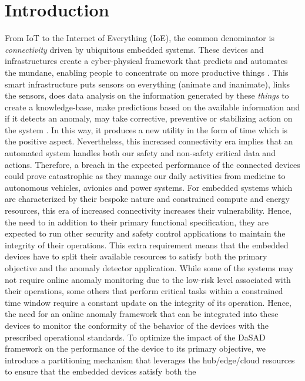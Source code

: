 \section{Introduction}
\label{sec:introduction}
From IoT to the Internet of Everything (IoE), the common denominator is 
\emph{connectivity} driven by ubiquitous embedded systems. These devices and 
infrastructures create a cyber-physical framework that predicts and automates 
the mundane, enabling people to concentrate on more productive things 
\cite{weldon2016future}. This smart infrastructure puts sensors on everything 
(animate and inanimate), links the sensors, does data analysis on the 
information generated by these \emph{things} to create a knowledge-base, make
predictions based on the available information and if it detects an anomaly, 
may take corrective, preventive or stabilizing action on the system 
\cite{ezeme2015multi}. In this way, it produces a new utility in the form of 
time which is the positive aspect. Nevertheless, this increased connectivity 
era implies that an automated system handles both our safety and non-safety 
critical data and actions. Therefore, a breach in the expected performance of 
the connected devices could prove catastrophic as they manage our daily 
activities from medicine to autonomous vehicles, avionics and power systems. 
For embedded systems which are characterized by their bespoke nature and 
constrained compute and energy resources, this era of increased connectivity 
increases their vulnerability. Hence, the need to in addition to their primary 
functional specification, they are expected to run other security and safety 
control applications
to maintain the integrity of their operations. This extra requirement means 
that the embedded devices have to split their available resources to satisfy 
both the primary objective and the anomaly detector application. While some of 
the systems may not require online anomaly monitoring due to the low-risk level 
associated with their operations, some others that perform critical tasks 
within a constrained time window require a constant update on the integrity of 
its operation. Hence, the need for an online anomaly framework that can be 
integrated into these devices to monitor the conformity of the behavior of the 
devices with the prescribed operational standards. To optimize the impact of 
the DaSAD framework on the performance of the device to its primary 
objective, we introduce a partitioning mechanism that leverages the 
hub/edge/cloud resources to ensure that the embedded devices satisfy both the 
